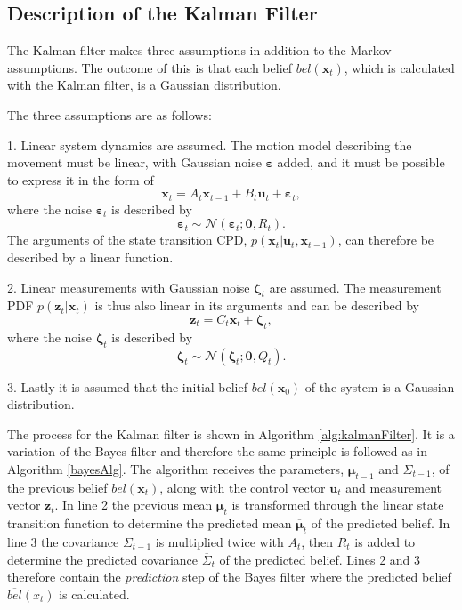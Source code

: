 \documentclass[12pt,oneside,openany,a4paper, %
afrikaans,english,
]{memoir}
\numberwithin{equation}{chapter}
\begin{document}
\subsection{Description of the Kalman Filter}
The Kalman filter makes three assumptions in addition to the Markov assumptions. The outcome of this is that each belief $bel(\bm{x}_t)$, which is calculated with the Kalman filter, is a Gaussian distribution.

The three assumptions are as follows:

1. Linear system dynamics are assumed. The motion model describing the movement must be linear, with Gaussian noise $\bm{\varepsilon}$ added, and it must be possible to express it in the form of
\begin{equation}\label{eq:linearKmm}
\bm{x}_t = A_t \bm{x}_{t - 1} + B_t \bm{u}_t + \bm{\varepsilon}_t,
\end{equation}
where the noise $\bm{\varepsilon}_t$ is described by 
\begin{equation}
\bm{\varepsilon}_t \sim \mathcal{N}(\bm{\varepsilon}_t; \bm{0}, R_t).
\end{equation}
The arguments of the state transition CPD, $p(\bm{x}_t|\bm{u}_t, \bm{x}_{t-1})$, can therefore be described by a linear function.

2. Linear measurements with Gaussian noise $\bm{\zeta}_t$ are assumed. The measurement PDF $p(\bm{z}_t|\bm{x}_t)$ is thus also linear in its arguments and can be described by
\begin{equation}
\bm{z}_t = C_t \bm{x}_t + \bm{\zeta}_t,
\end{equation} 
where the noise $\bm{\zeta}_t$ is described by
\begin{equation}\label{eq:linearMeasurements}
\bm{\zeta}_t \sim \mathcal{N}(\bm{\zeta}_t; \bm{0}, Q_t).
\end{equation}

3. Lastly it is assumed that the initial belief $bel(\bm{x}_0)$ of the system is a Gaussian distribution.

The process for the Kalman filter is shown in Algorithm \ref{alg:kalmanFilter}. It is a variation of the Bayes filter and therefore the same principle is followed as in Algorithm \ref{bayesAlg}. The algorithm receives the parameters, $\bm{\mu}_{t-1}$ and $\Sigma_{t-1}$, of the previous belief $bel(\bm{x}_t)$, along with the control vector $\bm{u}_t$ and measurement vector $\bm{z}_t$. In line 2 the previous mean $\bm{\mu}_t$ is transformed through the linear state transition function to determine the predicted mean $\overline{\bm{\mu}}_t$ of the predicted belief. In line 3 the covariance $\Sigma_{t-1}$ is multiplied twice with $A_t$, then $R_t$ is added to determine the predicted covariance $\overline{\Sigma}_t$ of the predicted belief. Lines 2 and 3 therefore contain the \textit{prediction} step of the Bayes filter where the predicted belief $\overline{bel}(x_t)$ is calculated. 
\end{document}
